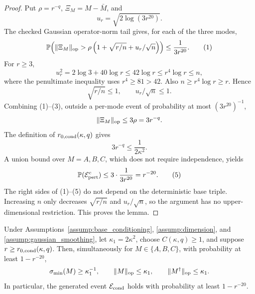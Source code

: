 \begin{proof}
Put \(\rho=r^{-q}\),
\(\Xi_M=M-\bar M\), and
\[
  u_r=\sqrt{2\log(3r^{20})}.
\]
The checked Gaussian operator-norm tail gives, for each of the three modes,
\[
  \mathbb P\!\left(
    \|\Xi_M\|_{\rm op}
    >\rho\left(1+\sqrt{r/n}+u_r/\sqrt n\right)
  \right)
  \le \frac1{3r^{20}}.                                      \tag{1}
\]
For \(r\ge3\),
\[
  u_r^2=2\log 3+40\log r
  \le42\log r
  \le r^4\log r
  \le n,                                                     \tag{2}
\]
where the penultimate inequality uses \(r^4\ge81>42\). Also
\(n\ge r^4\log r\ge r\). Hence
\[
  \sqrt{r/n}\le1,
  \qquad u_r/\sqrt n\le1.                                   \tag{3}
\]
Combining (1)--(3), outside a per-mode event of probability at most
\((3r^{20})^{-1}\),
\[
  \|\Xi_M\|_{\rm op}
  \le3\rho=3r^{-q}.
\]
The definition of \(r_{0,\rm cond}(\kappa,q)\) gives
\[
  3r^{-q}\le\frac1{2\kappa^2}.                              \tag{4}
\]
A union bound over \(M=A,B,C\), which does not require independence, yields
\[
  \mathbb P(\mathcal E_{\rm pert}^c)
  \le3\cdot\frac1{3r^{20}}=r^{-20}.                         \tag{5}
\]
The right sides of (1)--(5) do not depend on the deterministic base triple.
Increasing \(n\) only decreases \(\sqrt{r/n}\) and \(u_r/\sqrt n\), so the
argument has no upper-dimensional restriction. This proves the lemma.


\end{proof}


\begin{proposition}
\label{prop:step-001-realized-conditioning}
Under Assumptions~\ref{assump:base_conditioning},
\ref{assump:dimension}, and \ref{assump:gaussian_smoothing}, let
\(\kappa_1=2\kappa^2\), choose \(C(\kappa,q)\ge1\), and suppose
\(r\ge r_{0,\rm cond}(\kappa,q)\). Then, simultaneously for
\(M\in\{A,B,C\}\), with probability at least \(1-r^{-20}\),
\[
  \sigma_{\min}(M)\ge\kappa_1^{-1},
  \qquad
  \|M\|_{\rm op}\le\kappa_1,
  \qquad
  \|M^\dagger\|_{\rm op}\le\kappa_1.
\]
In particular, the generated event \(\mathcal E_{\rm cond}\) holds with
probability at least \(1-r^{-20}\).

\end{proposition}

